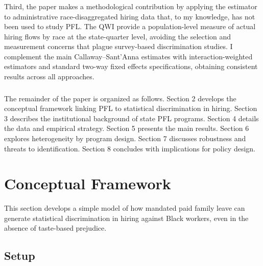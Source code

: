 \documentclass[12pt]{article}
\begin{document}
\subsubsection*{}
Third, the paper makes a methodological contribution by applying the \citet{callaway2021} estimator to administrative race-disaggregated hiring data that, to my knowledge, has not been used to study PFL. The QWI provide a population-level measure of actual hiring flows by race at the state-quarter level, avoiding the selection and measurement concerns that plague survey-based discrimination studies. I complement the main Callaway--Sant'Anna estimates with \citet{sun2021} interaction-weighted estimators and standard two-way fixed effects specifications, obtaining consistent results across all approaches.

\subsubsection*{}
The remainder of the paper is organized as follows. Section 2 develops the conceptual framework linking PFL to statistical discrimination in hiring. Section 3 describes the institutional background of state PFL programs. Section 4 details the data and empirical strategy. Section 5 presents the main results. Section 6 explores heterogeneity by program design. Section 7 discusses robustness and threats to identification. Section 8 concludes with implications for policy design.


\section{Conceptual Framework}

This section develops a simple model of how mandated paid family leave can generate statistical discrimination in hiring against Black workers, even in the absence of taste-based prejudice.

\subsection{Setup}
\end{document}

